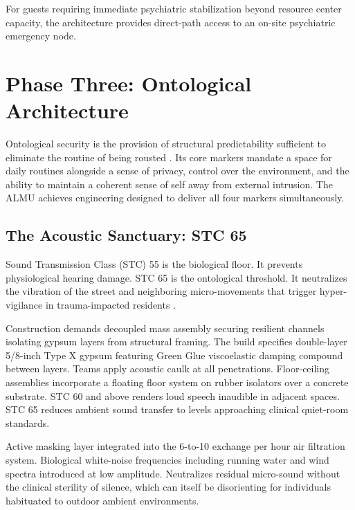 \documentclass[12pt, letterpaper]{article}
\begin{document}
For guests requiring immediate psychiatric stabilization beyond resource center capacity, the architecture provides direct-path access to an on-site psychiatric emergency node.

\clearpage

\section{Phase Three: Ontological Architecture}

Ontological security is the provision of structural predictability sufficient to eliminate the routine of being rousted \citep{giddens_1991, laing_1960}. Its core markers mandate a space for daily routines alongside a sense of privacy, control over the environment, and the ability to maintain a coherent sense of self away from external intrusion. The ALMU achieves engineering designed to deliver all four markers simultaneously.

\subsection{The Acoustic Sanctuary: STC 65}

Sound Transmission Class (STC) 55 is the biological floor. It prevents physiological hearing damage. STC 65 is the ontological threshold. It neutralizes the vibration of the street and neighboring micro-movements that trigger hyper-vigilance in trauma-impacted residents \citep{frontiers_acoustic_2024, gb_acoustics_2024}.

Construction demands decoupled mass assembly securing resilient channels isolating gypsum layers from structural framing. The build specifies double-layer 5/8-inch Type X gypsum featuring Green Glue viscoelastic damping compound between layers. Teams apply acoustic caulk at all penetrations. Floor-ceiling assemblies incorporate a floating floor system on rubber isolators over a concrete substrate. STC 60 and above renders loud speech inaudible in adjacent spaces. STC 65 reduces ambient sound transfer to levels approaching clinical quiet-room standards.

Active masking layer integrated into the 6-to-10 exchange per hour air filtration system. Biological white-noise frequencies including running water and wind spectra introduced at low amplitude. Neutralizes residual micro-sound without the clinical sterility of silence, which can itself be disorienting for individuals habituated to outdoor ambient environments.
\end{document}
